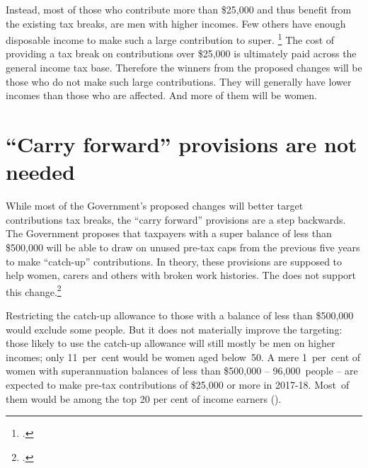 \documentclass[continuous]{grattan}\usepackage[]{graphicx}\usepackage[]{color}
\begin{document}
Instead, most of those who contribute more than \$25,000 and thus benefit from the existing tax breaks, are men with higher incomes.
Few others have enough disposable income to make such a large contribution to super.%
\footcite{Daley-Coates-2015-theConvo-Catch-up-super-contributions} %
The cost of providing a tax break on contributions over \$25,000 is ultimately paid across the general income tax base.
Therefore the winners from the proposed changes will be those who do not make such large contributions.
They will generally have lower incomes than those who are affected.
And more of them will be women.



\section{``Carry forward'' provisions are not needed}\label{sec:carry-fwd-provisions-not-needed}

While most of the Government’s proposed changes will better target contributions tax breaks, the “carry forward” provisions are a step backwards. 
The Government proposes that taxpayers with a super balance of less than \$500,000 will be able to draw on unused pre-tax caps from the previous five years to make ``catch-up'' contributions.
In theory, these provisions are supposed to help women, carers and others with broken work histories. 
The \ALP{} does not support this change.\footcite{Bowen-2016-Labors-plan-for-super-not-retrospective}

















Restricting the catch-up allowance to those with a balance of less than \$500,000 would exclude some people. 
But it does not materially improve the targeting: those likely to use the catch-up allowance will still mostly be men on higher incomes; 
only 11~per~cent would be women aged below~50.
A mere 1~per~cent of women with superannuation balances of less than \$500,000 -- 96,000~people -- are expected to make pre-tax contributions of \$25,000 or more in 2017-18.
Most~of them would be among the top 20 per cent of income earners (). %
\end{document}
